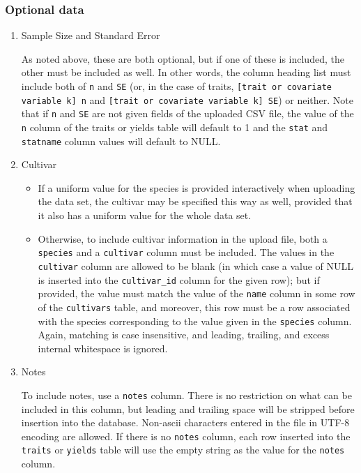 \subsubsection{Optional data}

\begin{enumerate}
\item Sample Size and Standard Error

  As noted above, these are both optional, but if one of these is
   included, the other must be included as well.  In other words, the
   column heading list must include both of \verb|n| and \verb|SE| (or, in the case of traits, \verb|[trait or covariate variable k] n| and \verb|[trait or covariate variable k] SE|) or neither.
   Note that if \verb|n| and \verb|SE| are not given fields of the uploaded CSV
   file, the value of the \verb|n| column of the traits or yields table will
   default to 1 and the \verb|stat| and \verb|statname| column values will default
   to NULL.
\item Cultivar

\begin{itemize}
\item If a uniform value for the species is provided interactively when
   uploading the data set, the cultivar may be specified this way as
   well, provided that it also has a uniform value for the whole data
   set.
\item Otherwise, to include cultivar information in the upload file, both a
   \verb|species| and a \verb|cultivar| column must be included.  The values in
   the \verb|cultivar| column are allowed to be blank (in which case a value
   of NULL is inserted into the \verb|cultivar_id| column for the given row);
   but if provided, the value must match the value of the \verb|name| column in
   some row of the \verb|cultivars| table, and moreover, this row must be a
   row associated with the species corresponding to the value given in
   the \verb|species| column.  Again, matching is case insensitive, and
   leading, trailing, and excess internal whitespace is ignored.
\end{itemize}

\item Notes

 To include notes, use a \verb|notes| column.  There is no restriction on
   what can be included in this column, but leading and trailing space
   will be stripped before insertion into the database.  Non-ascii
   characters entered in the file in UTF-8 encoding are allowed.  If
   there is no \verb|notes| column, each row inserted into the \verb|traits| or
   \verb|yields| table will use the empty string as the value for the \verb|notes|
   column.

   \end{enumerate}
